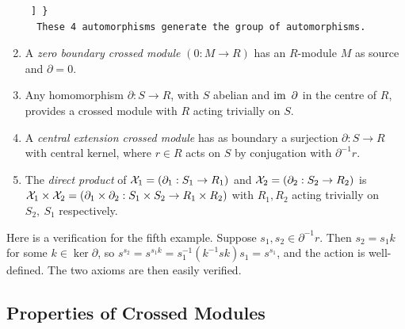 \begin{enumerate}
{\begin{verbatim}
 ] }
  These 4 automorphisms generate the group of automorphisms.
\end{verbatim}} 
\item A \emph{zero boundary crossed module} $(0 : M \to R)$ 
      has an $R$-module $M$ as source and $\partial = 0$.
\item Any homomorphism  $\partial : S \to R$,  with $S$ abelian
      and $\mathrm{im}\,\ \partial$ in the centre of $R$, provides a crossed module
      with  $R$  acting trivially on  $S$.
\item A \emph{central extension crossed module} 
      has as boundary a surjection
      $\partial : S \to R$ with central kernel,
      where $r \in R$ acts on $S$ by conjugation with $\partial^{-1}r$.
\item The \emph{direct product} of  
      $\mathcal{X}_1 = (\partial_1 : S_1 \to R_1)$ 
      and  $\mathcal{X}_2 = (\partial_2 : S_2 \to R_2)$  is
      $ \mathcal{X}_1 \times \mathcal{X}_2 = 
        (\partial_1 \times \partial_2 : S_1 \times S_2 \to R_1 \times R_2)$
      with  $R_1, R_2$  acting trivially on  $S_2,\ S_1$  respectively.
\end{enumerate}

\medskip
Here is a verification for the fifth example. 
Suppose $s_1,s_2 \in \partial^{-1}r$. 
Then $s_2 = s_1k$ for some $k \in \ker{\partial}$, 
so $s^{s_2} = s^{s_1k} = s_1^{-1}(k^{-1}sk)s_1 = s^{s_1}$, 
and the action is well-defined. 
The two axioms are then easily verified.

\subsection{Properties of Crossed Modules} \label{subs:xmod_prop}

